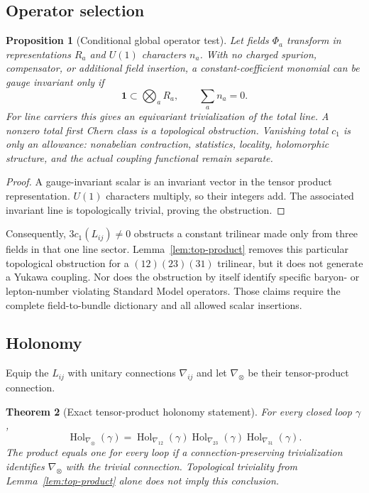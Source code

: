 \documentclass[11pt]{article}
\theoremstyle{plain}
\newtheorem{theorem}{Theorem}[section]
\newtheorem{proposition}[theorem]{Proposition}
\theoremstyle{definition}
\theoremstyle{remark}
\newcommand{\Hol}{\operatorname{Hol}}
\begin{document}
\subsection{Operator selection}

\begin{proposition}[Conditional global operator test]
\label{prop:operator-test}
Let fields $\Phi_a$ transform in representations $R_a$ and $U(1)$ characters
$n_a$. With no charged spurion, compensator, or additional field insertion, a
constant-coefficient monomial can be gauge invariant only if
\[
 \mathbf{1}\subset\bigotimes_a R_a,\qquad \sum_a n_a=0.
\]
For line carriers this gives an equivariant trivialization of the total line.
A nonzero total first Chern class is a topological obstruction. Vanishing total
$c_1$ is only an allowance: nonabelian contraction, statistics, locality,
holomorphic structure, and the actual coupling functional remain separate.
\end{proposition}

\begin{proof}
A gauge-invariant scalar is an invariant vector in the tensor product
representation. $U(1)$ characters multiply, so their integers add. The
associated invariant line is topologically trivial, proving the obstruction.
\end{proof}

Consequently, $3c_1(L_{ij})\ne0$ obstructs a constant trilinear made only from
three fields in that one line sector. Lemma~\ref{lem:top-product} removes this
particular topological obstruction for a $(12)(23)(31)$ trilinear, but it does
not generate a Yukawa coupling. Nor does the obstruction by itself identify
specific baryon- or lepton-number violating Standard Model operators. Those
claims require the complete field-to-bundle dictionary and all allowed scalar
insertions.

\subsection{Holonomy}

Equip the $L_{ij}$ with unitary connections $\nabla_{ij}$ and let
$\nabla_\otimes$ be their tensor-product connection.

\begin{theorem}[Exact tensor-product holonomy statement]
\label{thm:holonomy}
For every closed loop $\gamma$,
\[
 \Hol_{\nabla_\otimes}(\gamma)
 =\Hol_{\nabla_{12}}(\gamma)
  \Hol_{\nabla_{23}}(\gamma)
  \Hol_{\nabla_{31}}(\gamma).
\]
The product equals one for every loop if a connection-preserving
trivialization identifies $\nabla_\otimes$ with the trivial connection.
Topological triviality from Lemma~\ref{lem:top-product} alone does not imply
this conclusion.
\end{theorem}
\end{document}

